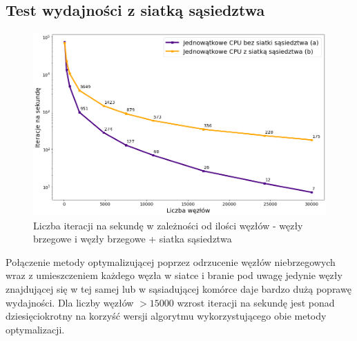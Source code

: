\documentclass[12pt, letterpaper]{report}
\begin{document}
    \subsection{Test wydajności z siatką sąsiedztwa}
    \begin{figure}[H]
        \centering
        \includegraphics[width=16cm]{performance_cpu_grid_nogrid.png}
        \caption{
            Liczba iteracji na sekundę w zależności od ilości węzłów -
            węzły brzegowe i węzły brzegowe + siatka sąsiedztwa
        }
    \end{figure}
    Połączenie metody optymalizującej poprzez odrzucenie węzłów niebrzegowych wraz z umieszczeniem każdego węzła
    w siatce i branie pod uwagę jedynie węzły znajdującej się w tej samej lub w sąsiadującej komórce daje 
    bardzo dużą poprawę wydajności. Dla liczby węzłów $>15000$ wzrost iteracji na sekundę jest ponad 
    dziesięciokrotny na korzyść wersji algorytmu wykorzystującego obie metody optymalizacji.

\end{document}

